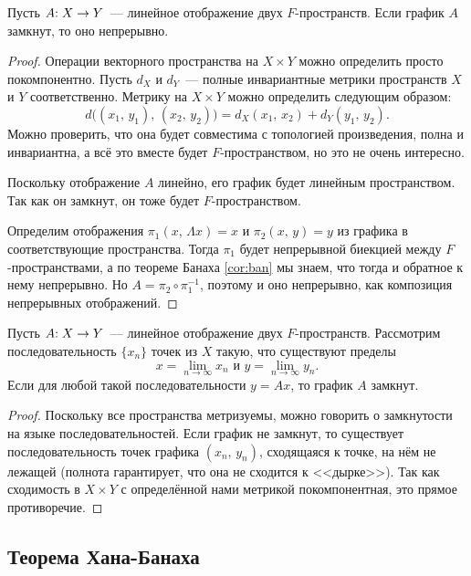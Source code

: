 \documentclass{notes}
\begin{document}
	\begin{thm}
		Пусть $A\text{\text{:}} \; X \to Y$~--- линейное отображение двух $F$-пространств. Если график $A$ замкнут, то оно непрерывно.
		\begin{proof}
			Операции векторного пространства на $X \times Y$ можно определить просто покомпонентно. Пусть $d_X$ и $d_Y$~--- полные инвариантные метрики пространств $X$ и $Y$ соответственно. Метрику на $X \times Y$ можно определить следующим образом:
			\[
				d\big((x_1, \, y_1), \, (x_2, \, y_2)\big) = d_X(x_1, \, x_2) + d_Y(y_1, \, y_2).
			\]
			Можно проверить, что она будет совместима с топологией произведения, полна и инвариантна, а всё это вместе будет $F$-пространством, но это не очень интересно.

			Поскольку отображение $A$ линейно, его график будет линейным пространством. Так как он замкнут, он тоже будет $F$-пространством.

			Определим отображения $\pi_1(x, \, \Lambda x) = x$ и $\pi_2(x, \, y) = y$ из графика в соответствующие пространства. Тогда $\pi_1$ будет непрерывной биекцией между $F$-пространствами, а по теореме Банаха \ref{cor:ban} мы знаем, что тогда и обратное к нему непрерывно. Но $A = \pi_2 \circ \pi_1^{-1}$, поэтому и оно непрерывно, как композиция непрерывных отображений.
		\end{proof}
	\end{thm}

	\begin{st}
		Пусть $A\text{\text{:}} \; X \to Y$~--- линейное отображение двух $F$-пространств. Рассмотрим последовательность $\{x_n\}$ точек из $X$ такую, что существуют пределы
		\[
			x = \lim\limits_{n \to \infty} x_n \text{ и } y = \lim\limits_{n \to \infty} y_n.
		\]
		Если для любой такой последовательности $y = Ax$, то график $A$ замкнут.
		\begin{proof}
			Поскольку все пространства метризуемы, можно говорить о замкнутости на языке последовательностей. Если график не замкнут, то существует последовательность точек графика $(x_n, \, y_n)$, сходящаяся к точке, на нём не лежащей (полнота гарантирует, что она не сходится к <<дырке>>). Так как сходимость в $X \times Y$ с определённой нами метрикой покомпонентная, это прямое противоречие.			
		\end{proof}
	\end{st}

\subsection{Теорема Хана-Банаха}
	
\end{document}

